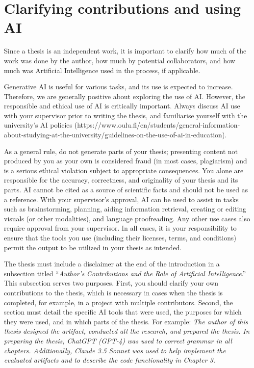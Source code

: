 \section{Clarifying contributions and using AI}
\label{AI}
Since a thesis is an independent work, it is important to clarify how
much of the work was done by the author, how much by potential
collaborators, and how much was Artificial Intelligence used in the
process, if applicable.

Generative AI is useful for various tasks, and its use is expected to
increase. Therefore, we are generally positive about exploring the
use of AI. However, the responsible and ethical use of AI is
critically important. Always discuss AI use with your supervisor
prior to writing the thesis, and familiarise yourself with the
university's AI policies
(https://www.oulu.fi/en/students/general-information-about-studying-at-the-university/guidelines-on-the-use-of-ai-in-education).

As a general rule, do not generate parts of your thesis; presenting
content not produced by you as your own is considered fraud (in most
cases, plagiarism) and is a serious ethical violation subject to
appropriate consequences. You alone are responsible for the accuracy,
correctness, and originality of your thesis and its parts. AI cannot
be cited as a source of scientific facts and should not be used as a
reference. With your supervisor's approval, AI can be used to assist
in tasks such as brainstorming, planning, aiding information
retrieval, creating or editing visuals (or other modalities), and
language proofreading. Any other use cases also require approval from
your supervisor. In all cases, it is your responsibility to ensure
that the tools you use (including their licenses, terms, and
conditions) permit the output to be utilized in your thesis as intended.

The thesis must include a disclaimer at the end of the introduction
in a subsection titled ``\textit{Author's Contributions and the Role
of Artificial Intelligence}.'' This subsection serves two purposes.
First, you should clarify your own contributions to the thesis, which
is necessary in cases when the thesis is completed, for example, in a
project with multiple contributors. Second, the section must detail
the specific AI tools that were used, the purposes for which they
were used, and in which parts of the thesis. For example: \textit{The
author of this thesis designed the artifact, conducted all the
research, and prepared the thesis. In preparing the thesis, ChatGPT
(GPT-4) was used to correct grammar in all chapters. Additionally,
Claude 3.5 Sonnet was used to help implement the evaluated artifacts
and to describe the code functionality in Chapter 3.}

